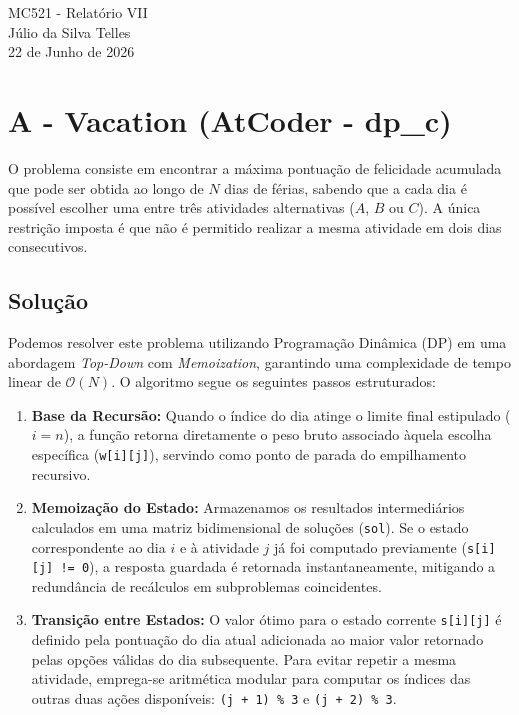 \documentclass[12pt,a4paper]{article}
\begin{document}
\begin{center}
    {\LARGE MC521 - Relatório VII} \\ [2,5em]
    {\large Júlio da Silva Telles} \\ [1,0em]
    {\large 22 de Junho de 2026} \\ [1,5em]
\end{center}

\vspace{1cm} 

\section{A - Vacation (AtCoder - dp\_c)}
O problema consiste em encontrar a máxima pontuação de felicidade acumulada que pode ser obtida ao longo de $N$ dias de férias, sabendo que a cada dia é possível escolher uma entre três atividades alternativas ($A$, $B$ ou $C$). A única restrição imposta é que não é permitido realizar a mesma atividade em dois dias consecutivos.

\subsection{Solução}
Podemos resolver este problema utilizando Programação Dinâmica (DP) em uma abordagem \textit{Top-Down} com \textit{Memoization}, garantindo uma complexidade de tempo linear de $\mathcal{O}(N)$. O algoritmo segue os seguintes passos estruturados:

\begin{enumerate}
    \item \textbf{Base da Recursão:} Quando o índice do dia atinge o limite final estipulado ($i = n$), a função retorna diretamente o peso bruto associado àquela escolha específica (\texttt{w[i][j]}), servindo como ponto de parada do empilhamento recursivo.
    \item \textbf{Memoização do Estado:} Armazenamos os resultados intermediários calculados em uma matriz bidimensional de soluções (\texttt{sol}). Se o estado correspondente ao dia $i$ e à atividade $j$ já foi computado previamente (\texttt{s[i][j] != 0}), a resposta guardada é retornada instantaneamente, mitigando a redundância de recálculos em subproblemas coincidentes.
    \item \textbf{Transição entre Estados:} O valor ótimo para o estado corrente \texttt{s[i][j]} é definido pela pontuação do dia atual adicionada ao maior valor retornado pelas opções válidas do dia subsequente. Para evitar repetir a mesma atividade, emprega-se aritmética modular para computar os índices das outras duas ações disponíveis: \texttt{(j + 1) \% 3} e \texttt{(j + 2) \% 3}.
\end{enumerate}
\end{document}

